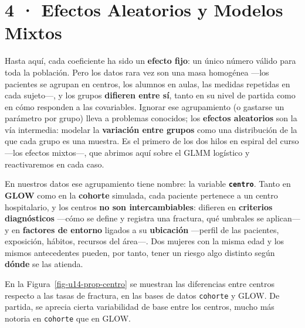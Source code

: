 \documentclass[
  letterpaper,
  DIV=11,
  numbers=noendperiod]{scrartcl}
\begin{document}
\hypertarget{sec-u14}{%
\section{4 · Efectos Aleatorios y Modelos Mixtos}\label{sec-u14}}

Hasta aquí, cada coeficiente ha sido un \textbf{efecto fijo}: un único
número válido para toda la población. Pero los datos rara vez son una
masa homogénea ---los pacientes se agrupan en centros, los alumnos en
aulas, las medidas repetidas en cada sujeto---, y los grupos
\textbf{difieren entre sí}, tanto en su nivel de partida como en cómo
responden a las covariables. Ignorar ese agrupamiento (o gastarse un
parámetro por grupo) lleva a problemas conocidos; los \textbf{efectos
aleatorios} son la vía intermedia: modelar la \textbf{variación entre
grupos} como una distribución de la que cada grupo es una muestra. Es el
primero de los dos hilos en espiral del curso ---los efectos mixtos---,
que abrimos aquí sobre el GLMM logístico y reactivaremos en cada caso.

En nuestros datos ese agrupamiento tiene nombre: la variable
\textbf{\texttt{centro}}. Tanto en \textbf{GLOW} como en la
\textbf{cohorte} simulada, cada paciente pertenece a un centro
hospitalario, y los centros \textbf{no son intercambiables}: difieren en
\textbf{criterios diagnósticos} ---cómo se define y registra una
fractura, qué umbrales se aplican--- y en \textbf{factores de entorno}
ligados a su \textbf{ubicación} ---perfil de las pacientes, exposición,
hábitos, recursos del área---. Dos mujeres con la misma edad y los
mismos antecedentes pueden, por tanto, tener un riesgo algo distinto
según \textbf{dónde} se las atienda.

En la Figura~\ref{fig-u14-prop-centro} se muestran las diferencias entre
centros respecto a las tasas de fractura, en las bases de datos
\texttt{cohorte} y GLOW. De partida, se aprecia cierta variabilidad de
base entre los centros, mucho más notoria en \texttt{cohorte} que en
GLOW.
\end{document}
